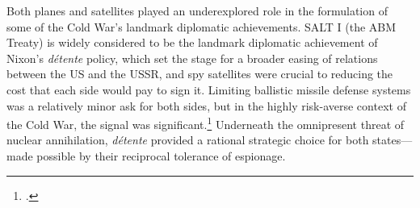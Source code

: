 \documentclass[14pt]{extarticle}
\begin{document}
Both planes and satellites played an underexplored role in the formulation of some of the Cold War's landmark diplomatic achievements. SALT I (the ABM Treaty) is widely considered to be the landmark diplomatic achievement of Nixon's \emph{d\'etente} policy, which set the stage for a broader easing of relations between the US and the USSR, and spy satellites were crucial to reducing the cost that each side would pay to sign it. Limiting ballistic missile defense systems was a relatively minor ask for both sides, but in the highly risk-averse context of the Cold War, the signal was significant.\footcite[p.~66]{glaser_rational_2010} Underneath the omnipresent threat of nuclear annihilation, \emph{d\'etente} provided a rational strategic choice for both states---made possible by their reciprocal tolerance of espionage.


\end{document}
